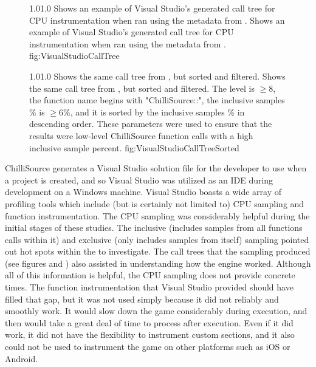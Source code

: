 \begin{figure}
\addtocounter{figure}{-1}
	{1.0}{1.0}
	{Shows an example of Visual Studio's generated call tree for CPU instrumentation when ran using the metadata from .}
	{Shows an example of Visual Studio's generated call tree for CPU instrumentation when ran using the metadata from .}
	{fig:VisualStudioCallTree}

	{1.0}{1.0}
	{Shows the same call tree from , but sorted and filtered.}
	{Shows the same call tree from , but sorted and filtered. The level is $ \geq 8 $, the function name begins with "ChilliSource::", the inclusive samples \% is $ \geq 6\% $, and it is sorted by the inclusive samples \% in descending order. These parameters were used to ensure that the results were low-level ChilliSource function calls with a high inclusive sample percent.}
	{fig:VisualStudioCallTreeSorted}
\end{figure}

ChilliSource generates a Visual Studio solution file for the developer to use when a project is created, and so Visual Studio was utilized as an IDE during development on a Windows machine. Visual Studio boasts a wide array of profiling tools which include (but is certainly not limited to) CPU sampling and function instrumentation. The CPU sampling was considerably helpful during the initial stages of these studies. The inclusive (includes samples from all functions calls within it) and exclusive (only includes samples from itself) sampling pointed out hot spots within the  to investigate. The call trees that the sampling produced (see figures  and ) also assisted in understanding how the engine worked. Although all of this information is helpful, the CPU sampling does not provide concrete times. The function instrumentation that Visual Studio provided should have filled that gap, but it was not used simply because it did not reliably and smoothly work. It would slow down the game considerably during execution, and then would take a great deal of time to process after execution. Even if it did work, it did not have the flexibility to instrument custom sections, and it also could not be used to instrument the game on other platforms such as iOS or Android.

